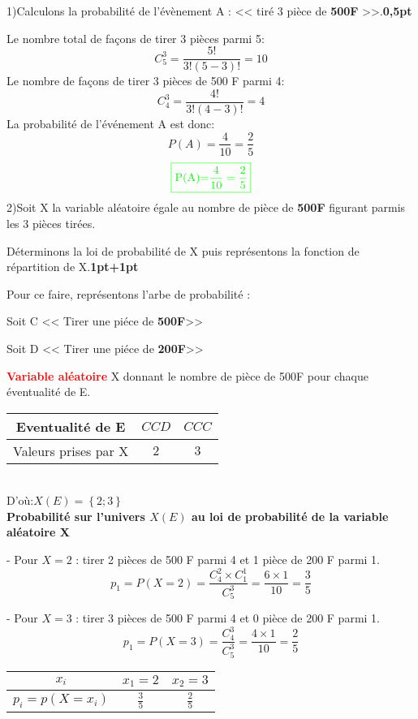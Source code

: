\documentclass[12pt]{article}
\begin{document}
1)Calculons la probabilité de l'évènement A : << tiré 3 pièce de \textbf{500F} >>.\textbf{0,5pt}

Le nombre total de façons de tirer 3 pièces parmi 5:
\[
C_{5}^{3} = \frac{5!}{3!(5-3)!} = 10
\]
Le nombre de façons de tirer 3 pièces de 500 F parmi 4:
\[
C_{4}^{3} = \frac{4!}{3!(4-3)!} = 4
\]
La probabilité de l'événement A est donc:
\[
P(A) = \frac{4}{10} = \frac{2}{5}
\]
\[\color{green}{\boxed{\text{P(A)=}\frac{4}{10} = \frac{2}{5}}}\]
2)Soit X la variable aléatoire égale au nombre de pièce de \textbf{500F} figurant parmis les 3 pièces tirées.

Déterminons la loi de probabilité de X puis représentons la fonction de répartition de X.\textbf{1pt+1pt}

Pour ce faire, représentons l'arbe de probabilité :
 
Soit C << Tirer une piéce de \textbf{500F}>>

Soit D << Tirer une piéce de \textbf{200F}>>

\textbf{\textcolor{red}{Variable aléatoire}} X donnant le nombre de pièce de 500F pour chaque éventualité de E.

\begin{tabular}{|c|c|c|}
\hline
Eventualité de E & $CCD$ & $CCC$ \\
\hline
Valeurs prises par X &$2$ &$3$\\
\hline
\end{tabular}\\
D'où:$X(E) = \left\lbrace 2 ; 3 \right\rbrace $\\

\textbf{Probabilité sur l'univers $X(E)$ au loi de probabilité de la variable aléatoire X}

- Pour \(X = 2\) : tirer 2 pièces de 500 F parmi 4 et 1 pièce de 200 F parmi 1.
\[
p_{1}=P(X = 2) = \frac{C_{4}^{2} \times C_{1}^{1}}{C_{5}^{3}} = \frac{6 \times 1}{10} = \frac{3}{5}
\]

- Pour \(X = 3\) : tirer 3 pièces de 500 F parmi 4 et 0 pièce de 200 F parmi 1.
\[
p_{1}=P(X = 3) = \frac{C_{4}^{3}}{C_{5}^{3}} = \frac{4 \times 1}{10} = \frac{2}{5}
\]

\begin{tabular}{|c|c|c|}
\hline
$x_{i}$ & $x_{1}=2$ & $x_{2}=3$\\
\hline
$p_{i} = p(X = x_{i}) $ &$\frac{3}{5}$ &$\frac{2}{5}$ \\
\hline
\end{tabular}
\end{document}

